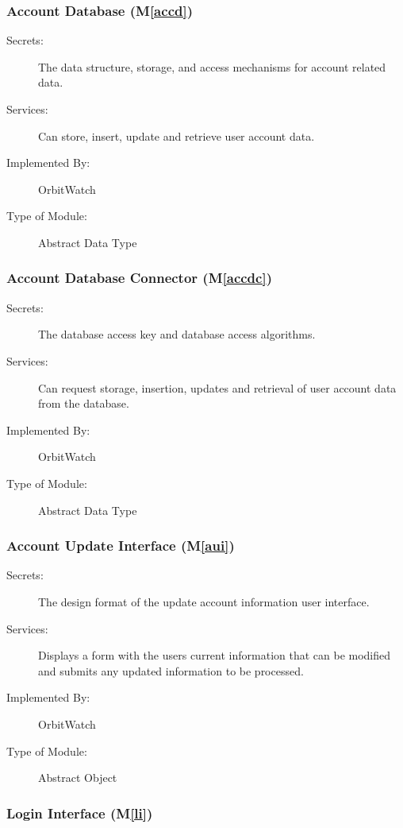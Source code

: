 \documentclass[12pt, titlepage]{article}
\newcommand{\mref}[1]{M\ref{#1}}
\begin{document}
\subsubsection{Account Database (\mref{accd})}

\begin{description} 
\item[Secrets:] The data structure, storage, and access mechanisms for account related data.
\item[Services:] Can store, insert, update and retrieve user account data.
\item[Implemented By:] OrbitWatch
\item[Type of Module:] Abstract Data Type
\end{description} 

\subsubsection{Account Database Connector (\mref{accdc})}

\begin{description}
\item[Secrets:] The database access key and database access algorithms.
\item[Services:] Can request storage, insertion, updates and retrieval of user account data from the database.
\item[Implemented By:] OrbitWatch
\item[Type of Module:] Abstract Data Type
\end{description}

\subsubsection{Account Update Interface (\mref{aui})}

\begin{description}
\item[Secrets:]The design format of the update account information user interface.
\item[Services:] Displays a form with the users current information that can be modified and submits any updated information to be processed.
\item[Implemented By:] OrbitWatch
\item[Type of Module:] Abstract Object
\end{description}

\subsubsection{Login Interface (\mref{li})}
\end{document}
